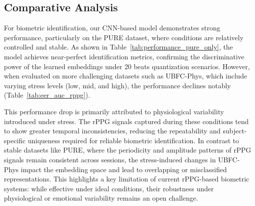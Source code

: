 \subsection{Comparative Analysis}
\begin{table}[h!]
\centering
\caption{EER and AUC for rPPG authentication on PURE, UBFC-Phys, and MSPM datasets under different signal lengths.}
\renewcommand{\arraystretch}{1.8}  %
\label{tab:eer_auc_rppg}
\end{table}
For biometric identification, our CNN-based model demonstrates strong performance, particularly on the PURE dataset, where conditions are relatively controlled and stable. As shown in Table~\ref{tab:performance_pure_only}, the model achieves near-perfect identification metrics, confirming the discriminative power of the learned embeddings under 20 beats quantization scenarios. However, when evaluated on more challenging datasets such as UBFC-Phys, which include varying stress levels (low, mid, and high), the performance declines notably (Table~\ref{tab:eer_auc_rppg}). 

This performance drop is primarily attributed to physiological variability introduced under stress. The rPPG signals captured during these conditions tend to show greater temporal inconsistencies, reducing the repeatability and subject-specific uniqueness required for reliable biometric identification. In contrast to stable datasets like PURE, where the periodicity and amplitude patterns of rPPG signals remain consistent across sessions, the stress-induced changes in UBFC-Phys impact the embedding space and lead to overlapping or misclassified representations. This highlights a key limitation of current rPPG-based biometric systems: while effective under ideal conditions, their robustness under physiological or emotional variability remains an open challenge.

